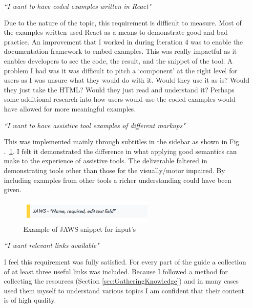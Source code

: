 \begin{center}
\textit{``I want to have coded examples written in React"}
\end{center}
Due to the nature of the topic, this requirement is difficult to
measure. Most of the examples written used React as a means to demonstrate
good and bad practice. An improvement that I worked in during Iteration 4 was
to enable the documentation framework to embed examples. This was really
impactful as it enables developers to see the code, the result, and the
snippet of the tool.
A problem I had was it was difficult to pitch a `component' at the right
level for users as I was
unsure what they would do with it. Would they use it as is? Would they just
take the HTML? Would they just read and understand it? Perhaps some additional
research into how users would use the coded examples would have allowed for
more meaningful examples.

\begin{center}
\textit{``I want to have assistive tool examples of different markups"}
\end{center}
This was implemented mainly through subtitles in the sidebar as shown in Fig
.~\ref{fig:a11y_guide_assistive_tool_snippet}. I felt it demonstrated  the difference
in what applying good semantics can make to the experience of assistive
tools. The deliverable faltered in demonstrating tools other than those for
the visually/motor impaired. By including examples from other tools a richer
understanding could have been given.

\begin{figure}[H]
\centering
\includegraphics[width=0.6\textwidth]{figures/a11y_guide_assistive_tool_snippet}
\captionsetup{justification=centering}
\caption{Example of JAWS snippet for input's
\label{fig:a11y_guide_assistive_tool_snippet}}
\end{figure}


\begin{center}
\textit{``I want relevant links available"}
\end{center}
I feel this requirement was fully satisfied. For every part of the guide a
collection of at least three useful links was included. Because I followed a
method for collecting the resources (Section \ref{sec:GatheringKnowledge}) and
in many cases used them myself to understand various topics I am confident
that their content is of high quality.

